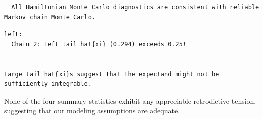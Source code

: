 \documentclass[
  letterpaper,
  DIV=11,
  numbers=noendperiod]{scrartcl}
\newenvironment{Shaded}{\begin{snugshade}}{\end{snugshade}}
\newcommand{\FunctionTok}[1]{\textcolor[rgb]{0.28,0.35,0.67}{#1}}
\newcommand{\NormalTok}[1]{\textcolor[rgb]{0.00,0.23,0.31}{#1}}
\newcommand{\OtherTok}[1]{\textcolor[rgb]{0.00,0.23,0.31}{#1}}
\newcommand{\SpecialCharTok}[1]{\textcolor[rgb]{0.37,0.37,0.37}{#1}}
\newcommand{\StringTok}[1]{\textcolor[rgb]{0.13,0.47,0.30}{#1}}
\begin{document}
\begin{verbatim}
  All Hamiltonian Monte Carlo diagnostics are consistent with reliable
Markov chain Monte Carlo.
\end{verbatim}

\begin{Shaded}
\end{Shaded}

\begin{verbatim}
left:
  Chain 2: Left tail hat{xi} (0.294) exceeds 0.25!


Large tail hat{xi}s suggest that the expectand might not be
sufficiently integrable.
\end{verbatim}

None of the four summary statistics exhibit any appreciable retrodictive
tension, suggesting that our modeling assumptions are adequate.
\end{document}
